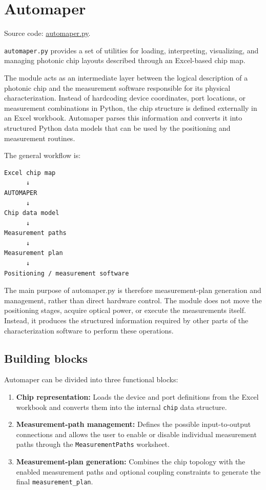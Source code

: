 \section{Automaper} 

Source code: \href{https://github.com/niospinamev2/SurugaSeikiHex/blob/main/rutinas/automaper.py}{automaper.py}.

\texttt{automaper.py} provides a set of utilities for loading, interpreting, visualizing, and managing photonic chip layouts described through an Excel-based chip map.

The module acts as an intermediate layer between the logical description of a photonic chip and the measurement software responsible for its physical characterization. Instead of hardcoding device coordinates, port locations, or measurement combinations in Python, the chip structure is defined externally in an Excel workbook. Automaper parses this information and converts it into structured Python data models that can be used by the positioning and measurement routines.

The general workflow is:

\begin{verbatim}
Excel chip map
      ↓
AUTOMAPER
      ↓
Chip data model
      ↓
Measurement paths
      ↓
Measurement plan
      ↓
Positioning / measurement software
\end{verbatim}

The main purpose of automaper.py is therefore measurement-plan generation and management, rather than direct hardware control. The module does not move the positioning stages, acquire optical power, or execute the measurements itself. Instead, it produces the structured information required by other parts of the characterization software to perform these operations.

\subsection{Building blocks}

Automaper can be divided into three functional blocks:

\begin{enumerate}
    \item \textbf{Chip representation:} Loads the device and port definitions from the Excel workbook and converts them into the internal \texttt{chip} data structure.
    \item \textbf{Measurement-path management:} Defines the possible input-to-output connections and allows the user to enable or disable individual measurement paths through the \newline \texttt{MeasurementPaths} worksheet.
    \item \textbf{Measurement-plan generation:} Combines the chip topology with the enabled measurement paths and optional coupling constraints to generate the final \texttt{measurement\_plan}.
\end{enumerate}

